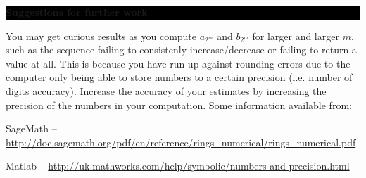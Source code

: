 \documentclass[oneside,10pt]{amsart}
\newcommand{\cbox}[1]{\colorbox{black}{\begin{minipage}{\linewidth}\color{white}\sffamily #1 \end{minipage}}}
\newcommand{\topic}[1]{\cbox{\textbf{#1}}}
\begin{document}
\topic{Suggestions for further work}
You may get curious results as you compute $a_{2^m}$ and $b_{2^m}$ for larger and larger $m$, such as the sequence failing to consistenly increase/decrease or failing to return a value at all. This is because you have run up against rounding errors due to the computer only being able to store numbers to a certain precision (i.e. number of digits accuracy). Increase the accuracy of your estimates by increasing the precision of the numbers in your computation. Some information available from:

SageMath --  \url{http://doc.sagemath.org/pdf/en/reference/rings_numerical/rings_numerical.pdf}

Matlab -- \url{http://uk.mathworks.com/help/symbolic/numbers-and-precision.html}
\end{document}
